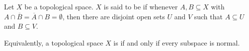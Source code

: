 \documentclass{article}
\begin{document}
Let $X$ be a topological space.  $X$ is said to be \emph{} if whenever $A,B\subseteq X$ with $A\cap\overline{B}=\overline{A}\cap B=\emptyset$, then there are disjoint open sets $U$ and $V$ such that $A\subseteq U$ and $B\subseteq V$.

Equivalently, a topological space $X$ is  if and only if every subspace is normal.
\end{document}
